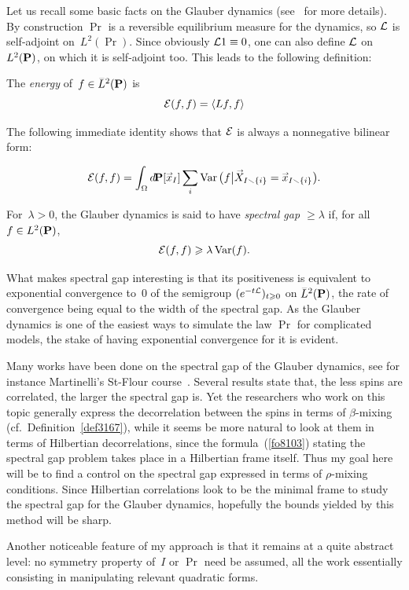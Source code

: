 Let us recall some basic facts on the Glauber dynamics
(see~\cite[Chapter~IV]{Liggett} for more details).
By construction $\Pr$ is a reversible equilibrium measure for the dynamics,
so $\mathcal{L}$ is self-adjoint on~$L^2(\Pr)$.
Since obviously $\mathcal{L}1\equiv0$, one can also define $\mathcal{L}$ on~$\ldb(\Pr)$,
on which it is self-adjoint too. This leads to the following definition:
%
\begin{Def}
The \emph{energy} of~$f\in\ldb(\Pr)$ is
\[ \mathcal{E}(f,f) = \langle Lf, f \rangle \]
\end{Def}
%
The following immediate identity shows that $\mathcal{E}$ is always a nonnegative bilinear form:
\begin{Pro}\label{p1345}
\[ \mcal{E}(f,f) = \int_\Omega \dx\Pr[\vec{x}_I]
\sum_i \Var\big( f \big| \vec{X}_{I\setminus\{i\}} = \vec{x}_{I\setminus\{i\}} \big) .\]
\end{Pro}

\begin{Def}
For~$\lambda > 0$, the Glauber dynamics is said to have \emph{spectral gap $\geq\lambda$}
if, for all~$f\in\ldb(\Pr)$,
\[\label{fo8103} \mathcal{E}(f,f) \geqslant \lambda \operatorname{Var}(f) .\]
\end{Def}
%
What makes spectral gap interesting is that its positiveness
is equivalent to exponential convergence to~$0$
of the semigroup $(e^{-t\mathcal{L}})_{t\geqslant0}$ on $\ldb(\Pr)$,
the rate of convergence being equal to the width of the spectral gap.
As the Glauber dynamics is one of the easiest ways to simulate the law $\Pr$ for complicated models,
the stake of having exponential convergence for it is evident.

Many works have been done on the spectral gap of the Glauber dynamics,
see for instance Martinelli's St-Flour course~\cite{Martinelli}.
Several results state that,
the less spins are correlated, the larger the spectral gap is.
Yet the researchers who work on this topic generally express
the decorrelation between the spins in terms of $\beta$-mixing (cf.\ Definition~\ref{def3167}),
while it seems be more natural to look at them in terms of Hilbertian decorrelations,
since the formula~(\ref{fo8103}) stating the spectral gap problem
takes place in a Hilbertian frame itself.
Thus my goal here will be to find a control on the spectral gap
expressed in terms of $\rho$-mixing conditions.
Since Hilbertian correlations look to be the minimal frame
to study the spectral gap for the Glauber dynamics,
hopefully the bounds yielded by this method will be sharp.

Another noticeable feature of my approach
is that it remains at a quite abstract level:
no symmetry property of~$I$ or $\Pr$ need be assumed,
all the work essentially consisting in manipulating relevant quadratic forms.



